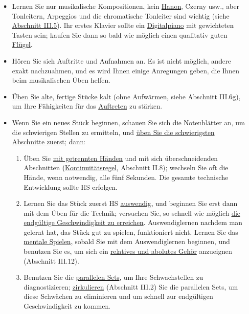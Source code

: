 \begin{itemize} 
\item Lernen Sie nur musikalische Kompositionen, kein \hyperlink{c1iii7h}{Hanon}, Czerny usw., aber Tonleitern, Arpeggios und die chromatische Tonleiter sind wichtig (siehe \hyperlink{c1iii5a}{Abschnitt III.5}).
Ihr erstes Klavier sollte ein \hyperlink{c1iii17b}{Digitalpiano} mit gewichteten Tasten sein; kaufen Sie dann so bald wie möglich einen qualitativ guten \hyperlink{c1iii17d}{Flügel}.

\item Hören Sie sich Auftritte und Aufnahmen an.
Es ist nicht möglich, andere exakt nachzuahmen, und es wird Ihnen einige Anregungen geben, die Ihnen beim musikalischen Üben helfen.

\item \hyperlink{c1iii6g}{Üben Sie alte, fertige Stücke kalt} (ohne Aufwärmen, siehe Abschnitt III.6g), um Ihre Fähigkeiten für das \hyperlink{c1iii14}{Auftreten} zu stärken.

\item Wenn Sie ein neues Stück beginnen, schauen Sie sich die Notenblätter an, um die schwierigen Stellen zu ermitteln, und \hyperlink{c1ii5}{üben Sie die schwierigsten Abschnitte zuerst}; dann:

 \begin{enumerate}[label={\alph*.}] 
\item Üben Sie \hyperlink{c1ii7}{mit getrennten Händen} und mit sich überschneidenden Abschnitten (\hyperlink{c1ii8}{Kontinuitätsregel}, Abschnitt II.8); wechseln Sie oft die Hände, wenn notwendig, alle fünf Sekunden.
Die gesamte technische Entwicklung sollte HS erfolgen.
 
 \item Lernen Sie das Stück zuerst HS \hyperlink{c1iii6}{auswendig}, und beginnen Sie erst dann mit dem Üben für die Technik; versuchen Sie, so schnell wie möglich \hyperlink{c1iii7i}{die endgültige Geschwindigkeit zu erreichen}.
Auswendiglernen nachdem man gelernt hat, das Stück gut zu spielen, funktioniert nicht.
Lernen Sie das \hyperlink{c1ii12mental}{mentale Spielen}, sobald Sie mit dem Auswendiglernen beginnen, und benutzen Sie es, um sich ein \hyperlink{c1iii12}{relatives und abolutes Gehör} anzueignen (Abschnitt III.12).
 
 \item Benutzen Sie die \hyperlink{c1ii11}{parallelen Sets}, um Ihre Schwachstellen zu diagnostizieren; \hyperlink{c1iii2}{zirkulieren} (Abschnitt III.2) Sie die parallelen Sets, um diese Schwächen zu eliminieren und um schnell zur endgültigen Geschwindigkeit zu kommen.
 

\end{enumerate}
\end{itemize}
